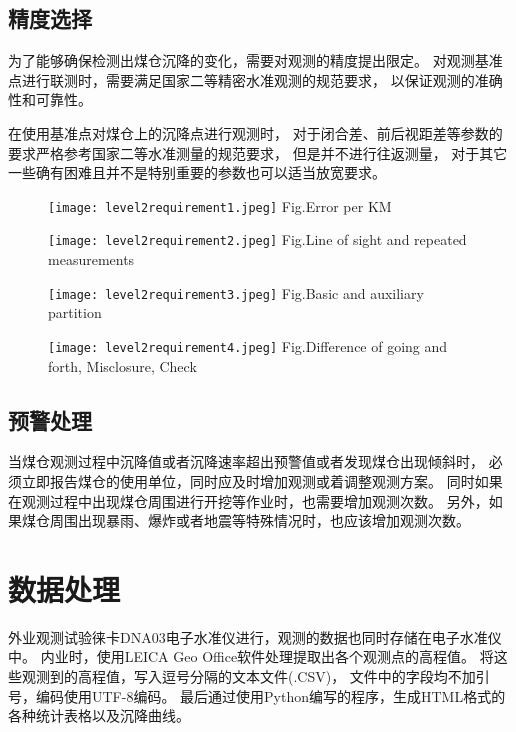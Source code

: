 \subsection{精度选择}
为了能够确保检测出煤仓沉降的变化，需要对观测的精度提出限定。
对观测基准点进行联测时，需要满足国家二等精密水准观测的规范要求，
以保证观测的准确性和可靠性。

在使用基准点对煤仓上的沉降点进行观测时，
对于闭合差、前后视距差等参数的要求严格参考国家二等水准测量的规范要求，
但是并不进行往返测量，
对于其它一些确有困难且并不是特别重要的参数也可以适当放宽要求。
\begin{figure}[!htbp]
   \centering
   \texttt{[image: level2requirement1.jpeg]}
								{Fig.}{Error per KM}
\end{figure}

\begin{figure}[!htbp]
   \centering
   \texttt{[image: level2requirement2.jpeg]}
						{Fig.}{Line of sight and repeated measurements}
\end{figure}

\begin{figure}[!htbp]
   \centering
   \texttt{[image: level2requirement3.jpeg]}
								{Fig.}{Basic and auxiliary partition}
\end{figure}

\begin{figure}[!htbp]
   \centering
   \texttt{[image: level2requirement4.jpeg]}
			{Fig.}{Difference of going and forth, Misclosure, Check}
\end{figure}

\newpage
\subsection{预警处理}
当煤仓观测过程中沉降值或者沉降速率超出预警值或者发现煤仓出现倾斜时，
必须立即报告煤仓的使用单位，同时应及时增加观测或着调整观测方案。
同时如果在观测过程中出现煤仓周围进行开挖等作业时，也需要增加观测次数。
另外，如果煤仓周围出现暴雨、爆炸或者地震等特殊情况时，也应该增加观测次数。


\section{数据处理}
外业观测试验徕卡DNA03电子水准仪进行，观测的数据也同时存储在电子水准仪中。
内业时，使用LEICA Geo Office软件处理提取出各个观测点的高程值。
将这些观测到的高程值，写入逗号分隔的文本文件(.CSV)，
文件中的字段均不加引号，编码使用UTF-8编码。
最后通过使用Python编写的程序，生成HTML格式的各种统计表格以及沉降曲线。

